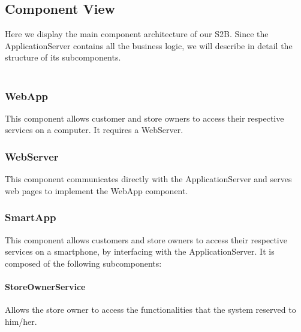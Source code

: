 \subsection{Component View}
Here we display the main component architecture of our S2B. Since the ApplicationServer contains all the business logic, we will describe in detail the structure of its subcomponents.\\\\
\begin{figure}[H]
	\noindent
\end{figure}


\subsubsection{WebApp}
This component allows customer and store owners to access their respective services on a computer. It requires a WebServer.
\subsubsection{WebServer}
This component communicates directly with the ApplicationServer and serves web pages to implement the WebApp component.
\subsubsection{SmartApp}
This component allows customers and store owners to access their respective services on a smartphone, by interfacing with the ApplicationServer. It is composed of the following subcomponents:
\paragraph{StoreOwnerService}Allows the store owner to access the functionalities that the system reserved to him/her.
